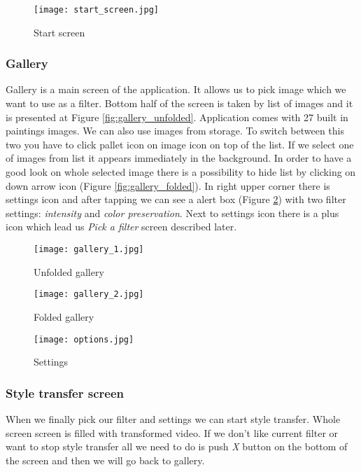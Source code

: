\documentclass[../Main.tex]{subfiles}
\begin{document}
\begin{figure}[H]
    \centering
    \texttt{[image: start\_screen.jpg]}
    \caption{Start screen}
    \label{fig:start-screen}
\end{figure}


\subsubsection{Gallery}
Gallery is a main screen of the application. It allows us to pick image 
which we want to use as a filter. Bottom half of the screen is taken by list of images and it is presented at Figure \ref{fig:gallery_unfolded}.
Application comes with 27 built in paintings images. We can also use images from storage.
To switch between this two you have to click pallet icon on image icon on top of the list.
If we select one of images from list it appears immediately in the background.
In order to have a good look on whole selected image there is a possibility 
to hide list by clicking on down arrow icon (Figure \ref{fig:gallery_folded}).
In right upper corner there is settings icon and after tapping we can see a 
alert box (Figure \ref{fig:gallery_options}) with two filter settings:
\textit{intensity} and \textit{color preservation}.
Next to settings icon there is a plus icon which lead us \textit{Pick a filter} 
screen described later.

\begin{figure}[H]
        \texttt{[image: gallery\_1.jpg]}
        \caption{Unfolded gallery}\label{fig:gallery_unfolded}
    \endminipage\hfill
        \texttt{[image: gallery\_2.jpg]}
        \caption{Folded gallery}\label{fig:gallery_folded}
    \endminipage\hfill
        \texttt{[image: options.jpg]}
        \caption{Settings}\label{fig:gallery_options}
    \endminipage\hfill
\end{figure}


\subsubsection{Style transfer screen}
When we finally pick our filter and settings we can start style transfer.
Whole screen screen is filled with transformed video.
If we don't like current filter or want to stop style transfer all we need to 
do is push \textit{X} button on the bottom of the screen 
and then we will go back to gallery.
\end{document}
